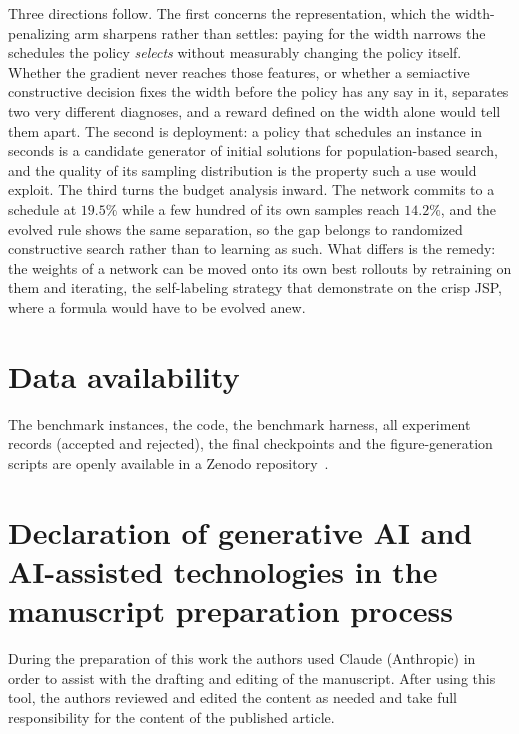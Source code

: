 \documentclass[preprint,authoryear,12pt]{elsarticle}
\theoremstyle{definition}
\theoremstyle{remark}
\begin{document}
Three directions follow. The first concerns the representation, which
the width-penalizing arm sharpens rather than settles: paying for the
width narrows the schedules the policy \emph{selects} without
measurably changing the policy itself. Whether the gradient never
reaches those features, or whether a semiactive constructive decision
fixes the width before the policy has any say in it, separates two
very different diagnoses, and a reward defined on the width alone
would tell them apart. The second is deployment: a policy that
schedules an instance in seconds is a candidate generator of initial
solutions for population-based search, and the quality of its
sampling distribution is the property such a use would exploit. The
third turns the budget analysis inward. The network commits to a
schedule at $19.5\%$ while a few hundred of its own samples reach
$14.2\%$, and the evolved rule shows the same separation, so the gap
belongs to randomized constructive search rather than to learning as
such. What
differs is the remedy: the weights of a network can be moved onto its
own best rollouts by retraining on them and iterating, the
self-labeling strategy that \citet{Corsini2024} demonstrate on the
crisp JSP, where a formula would have to be evolved anew.


\section*{Data availability}
The benchmark instances, the code,
the benchmark harness, all experiment records (accepted and
rejected), the final checkpoints and the figure-generation scripts
are openly available in a Zenodo
repository~\citep{DiazDRLDataset2026}.

\section*{Declaration of generative AI and AI-assisted technologies
in the manuscript preparation process}
During the preparation of this work the authors used Claude
(Anthropic) in order to assist with the drafting and editing of the
manuscript. After using this tool, the authors reviewed and edited
the content as needed and take full responsibility for the content of
the published article.
\end{document}
